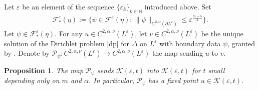 \documentclass[11pt]{amsart}
\newtheorem{proposition}{Proposition}
\theoremstyle{definition}
\theoremstyle{remark}
\begin{document}
Let $\varepsilon$ be an element of the sequence $\{\varepsilon_k\}_{k\in \mathbb{N}}$ introduced above. Set
    \begin{align*}
        \mathscr{F}_\ast^\varepsilon(\eta):=\{\psi\in \mathscr{F}^\varepsilon(\eta):\,\lVert \psi\rVert_{C^{2,\alpha}(\partial L^\varepsilon)}\leq \varepsilon^{\frac{m+5}{2}}\}.
    \end{align*}
    Let $\psi\in \mathscr{F}^\varepsilon_\ast(\eta)$.
    For any $u\in C^{2,\alpha,\nu}(L^\varepsilon)$, let $v\in C^{2,\alpha,\nu}(L^\varepsilon)$ be the unique solution of the Dirichlet problem \eqref{dp} for $\Delta$ on $L^\varepsilon$ with boundary data $\psi$, granted by \cite[Theorem 2.3]{Sm93}. Denote by $\mathcal{P}_{\psi}: C^{2,\alpha, \nu}(L^\varepsilon)\to C^{2,\alpha, \nu}(L^\varepsilon)$ the map sending $u$ to $v$. 
\begin{proposition}\label{prop: fixed-point-theorem}
    The map $\mathcal{P}_{\psi}$ sends $\mathscr{K}(\varepsilon, t)$ into $\mathscr{K}(\varepsilon,t)$ for $t$ small depending only on $m$ and $\alpha$. In particular, $\mathcal{P}_{\psi}$ has a fixed point $u \in \mathscr{K}(\varepsilon,t)$.
\end{proposition}
\end{document}
